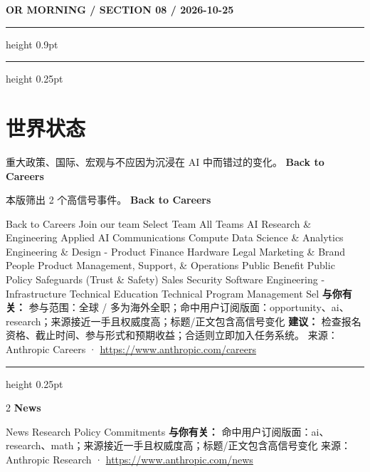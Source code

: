 \documentclass[10.5pt]{ctexart}
\begin{document}
\newpage
{\small\bfseries OR MORNING / SECTION 08 / 2026-10-25}
\vspace{2mm}
\hrule height 0.9pt
\vspace{1.5mm}
\hrule height 0.25pt
\vspace{4mm}
\section*{世界状态}
{\color{ormuted} 重大政策、国际、宏观与不应因为沉浸在 AI 中而错过的变化。}
\vspace{2mm}
{\LARGE\bfseries Back to Careers}\par
\vspace{1mm}
{\color{ormuted} 本版筛出 2 个高信号事件。}
\vspace{3mm}
{\Large\bfseries Back to Careers}\par
Back to Careers Join our team Select Team All Teams AI Research \& Engineering Applied AI Communications Compute Data Science \& Analytics Engineering \& Design - Product Finance Hardware Legal Marketing \& Brand People Product Management, Support, \& Operations Public Benefit Public Policy Safeguards (Trust \& Safety) Sales Security Software Engineering - Infrastructure Technical Education Technical Program Management Sel
\textbf{与你有关：} 参与范围：全球 / 多为海外全职；命中用户订阅版面：opportunity、ai、research；来源接近一手且权威度高；标题/正文包含高信号变化
\textbf{建议：} 检查报名资格、截止时间、参与形式和预期收益；合适则立即加入任务系统。
{\footnotesize\color{ormuted} 来源：Anthropic Careers · \url{https://www.anthropic.com/careers}}
\vspace{4mm}
\hrule height 0.25pt
\vspace{3mm}
\begin{multicols}{2}
{\large\bfseries News}\par
News Research Policy Commitments
\textbf{与你有关：} 命中用户订阅版面：ai、research、math；来源接近一手且权威度高；标题/正文包含高信号变化
{\footnotesize\color{ormuted} 来源：Anthropic Research · \url{https://www.anthropic.com/news}}
\end{multicols}
\end{document}

